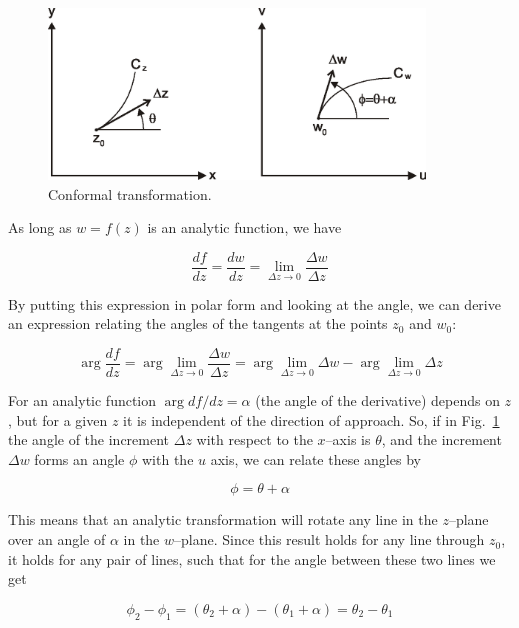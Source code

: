 \begin{figure}
\centering
\includegraphics[width=10cm]{complex/figures/conformal}
\caption{Conformal transformation.}
\label{fig-conformal}
\end{figure}

As long as $w=f(z)$ is an analytic function, we have

\begin{equation}
\frac{df}{dz} = \frac{dw}{dz} = \lim_{\Delta z \to 0} \frac{\Delta w}{\Delta z}
\end{equation}

By putting this expression in polar form and looking at the angle, we can derive
an expression relating the angles of the tangents at the points $z_0$ and $w_0$:

\begin{equation}
\arg \frac{df}{dz} = \arg \lim_{\Delta z \to 0} \frac{\Delta w}{\Delta z} = \arg
\lim_{\Delta z   \to 0} \Delta w - \arg \lim_{\Delta z \to 0} \Delta z
\end{equation} 

For an analytic function $\arg df / dz = \alpha$ (the angle of the derivative)
depends on $z$, but for a given $z$ it is independent of the direction of
approach. So, if in Fig.~\ref{fig-conformal} the angle of the increment $\Delta
z$ with respect to the $x$--axis is $\theta$, and the increment $\Delta w$ forms
an angle $\phi$ with the $u$ axis, we can relate these angles by

\begin{equation}
\phi = \theta + \alpha
\end{equation}

This means that an analytic transformation will rotate any line in the
$z$--plane over an angle of $\alpha$ in the $w$--plane.
Since this result holds for any line through $z_0$, it holds for any pair of
lines, such that for the angle between these two lines we get

\begin{equation}
\phi_2 - \phi_1 = (\theta_2 + \alpha) - (\theta_1 + \alpha) = \theta_2 -
\theta_1
\end{equation} 

